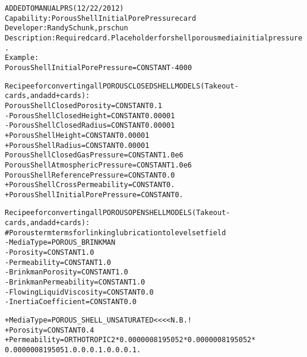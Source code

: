 \documentclass{article}
\begin{document}
\begin{alltt}
ADDED TO MANUAL PRS (12/22/2012)
Capability:  Porous Shell Initial Pore Pressure  card
Developer: Randy Schunk, prschun
Description: Required card. Place holder for shell porous media initial pressure.  
Example: 
Porous Shell Initial Pore Pressure = CONSTANT -4000


Recipee for converting all POROUS CLOSED SHELL MODELS (Take out -
 cards, and add + cards):
 Porous Shell Closed Porosity      = CONSTANT 0.1
-Porous Shell Closed Height        = CONSTANT 0.00001
-Porous Shell Closed Radius        = CONSTANT 0.00001
+Porous Shell Height               = CONSTANT 0.00001
+Porous Shell Radius               = CONSTANT 0.00001
 Porous Shell Closed Gas Pressure  = CONSTANT 1.0e6
 Porous Shell Atmospheric Pressure = CONSTANT 1.0e6
 Porous Shell Reference Pressure   = CONSTANT 0.0
+Porous Shell Cross Permeability = CONSTANT {0.}
+Porous Shell Initial Pore Pressure = CONSTANT 0.


Recipee for converting all POROUS OPEN SHELL MODELS  (Take out -
 cards, and add + cards):
 # Porous term terms for linking lubrication to level set field
-Media Type                        = POROUS_BRINKMAN
-Porosity                           = CONSTANT 1.0
-Permeability                              = CONSTANT 1.0
-Brinkman Porosity                  = CONSTANT 1.0
-Brinkman Permeability              = CONSTANT 1.0
-FlowingLiquid Viscosity            = CONSTANT 0.0
-Inertia Coefficient                = CONSTANT 0.0

+Media Type                        = POROUS_SHELL_UNSATURATED  <<<<N. B.!
+Porosity                = CONSTANT    {0.4}
+Permeability            = ORTHOTROPIC {2*0.000000819505} {2*0.000000819505} {2*
0.000000819505} 1. 0. 0. 0. 1. 0. 0. 0. 1. 
 

\end{alltt}
\end{document}
